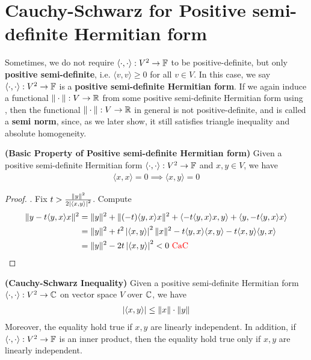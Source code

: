 \documentclass{report}
\begin{document}
\section{Cauchy-Schwarz for Positive semi-definite Hermitian form}
\begin{mdframed}
  Sometimes, we do not require $\langle \cdot,\cdot\rangle :V^2\rightarrow \mathbb{F}$ to be positive-definite, but only \textbf{positive semi-definite}, i.e. $\langle v,v\rangle \geq 0$ for all $v\in V$. In this case, we say $\langle \cdot, \cdot\rangle :V^2\rightarrow \mathbb{F}$ is a \textbf{positive semi-definite Hermitian form}. If we again induce a functional $\| \cdot \|:V\rightarrow \mathbb{R}$ from some positive semi-definite Hermitian form using , then the functional $\| \cdot \|:V\rightarrow \mathbb{R}$ in general is not positive-definite, and is called a \textbf{semi norm}, since, as we later show, it still satisfies triangle inequality and absolute homogeneity.
\end{mdframed}
\begin{theorem}
\label{BPoP}
\textbf{(Basic Property of Positive semi-definite Hermitian form)} Given a positive semi-definite Hermitian form $\langle \cdot,\cdot\rangle:V^2 \rightarrow \mathbb{F}$ and $x,y \in V$, we have 
\begin{align*}
\langle x,x\rangle =0 \implies \langle x,y\rangle =0
\end{align*}
\end{theorem}
\begin{proof}
. Fix $t> \frac{\| y \|^2 }{2\left|\langle x,y\rangle \right|^2}$. Compute 
\begin{align*}
\| y-t\langle y,x\rangle x \|^2 &= \| y \|^2 + \| (-t)\langle y,x\rangle x  \|^2  + \langle -t\langle y,x\rangle x,y \rangle + \langle y,-t\langle y,x\rangle x\rangle \\
&=\| y \|^2 + t^2 \left|\langle x,y\rangle \right|^2 \| x \|^2 -t \langle y,x\rangle \langle x,y\rangle - t \langle x,y\rangle \langle y,x\rangle  \\
&= \| y \|^2- 2t \left|\langle x,y\rangle \right|^2 <0 \text{ \textcolor{red}{CaC} }
\end{align*}
\end{proof}
\begin{theorem}
\label{CSI}
\textbf{(Cauchy-Schwarz Inequality)} Given a positive semi-definite Hermitian form $\langle \cdot,\cdot\rangle :V^2\rightarrow \mathbb{C}$ on vector space $V$ over $\mathbb{C}$, we have
\begin{align*}
\left|\langle x,y\rangle \right|\leq \| x \|\cdot \| y \|
\end{align*}
Moreover, the equality hold true if $x,y$ are linearly independent. In addition, if $\langle \cdot,\cdot\rangle :V^2\rightarrow \mathbb{F}$ is an inner product, then the equality hold true only if $x,y$ are linearly independent.   
\end{theorem}
\end{document}
